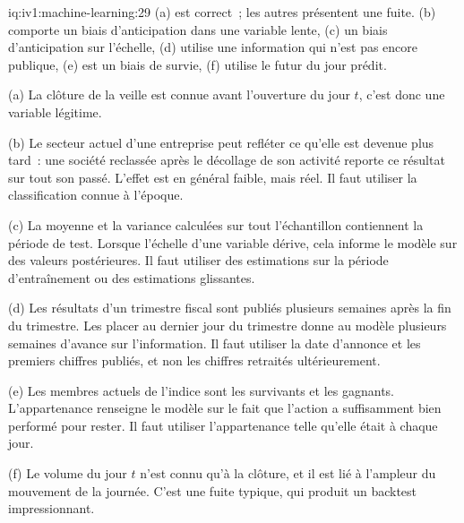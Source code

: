 \begin{solution}{iq:iv1:machine-learning:29}
(a) est correct~; les autres présentent une fuite. (b) comporte un biais d'anticipation dans une variable lente, (c) un biais d'anticipation sur l'échelle, (d) utilise une information qui n'est pas encore publique, (e) est un biais de survie, (f) utilise le futur du jour prédit.

(a) La clôture de la veille est connue avant l'ouverture du jour $t$, c'est donc une variable légitime.

(b) Le secteur actuel d'une entreprise peut refléter ce qu'elle est devenue plus tard~: une société reclassée après le décollage de son activité reporte ce résultat sur tout son passé. L'effet est en général faible, mais réel. Il faut utiliser la classification connue à l'époque.

(c) La moyenne et la variance calculées sur tout l'échantillon contiennent la période de test. Lorsque l'échelle d'une variable dérive, cela informe le modèle sur des valeurs postérieures. Il faut utiliser des estimations sur la période d'entraînement ou des estimations glissantes.

(d) Les résultats d'un trimestre fiscal sont publiés plusieurs semaines après la fin du trimestre. Les placer au dernier jour du trimestre donne au modèle plusieurs semaines d'avance sur l'information. Il faut utiliser la date d'annonce et les premiers chiffres publiés, et non les chiffres retraités ultérieurement.

(e) Les membres actuels de l'indice sont les survivants et les gagnants. L'appartenance renseigne le modèle sur le fait que l'action a suffisamment bien performé pour rester. Il faut utiliser l'appartenance telle qu'elle était à chaque jour.

(f) Le volume du jour $t$ n'est connu qu'à la clôture, et il est lié à l'ampleur du mouvement de la journée. C'est une fuite typique, qui produit un backtest impressionnant.



\end{solution}

